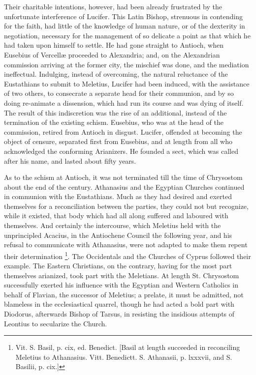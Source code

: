 Their charitable intentions, however, had been already frustrated
by the unfortunate interference of Lucifer. This Latin Bishop,
strenuous in contending for the faith, had little of the knowledge of
human nature, or of the dexterity in negotiation, necessary for the
management of so delicate a point as that which he had taken upon
himself to settle. He had gone straight to Antioch, when Eusebius of
Vercellæ proceeded to Alexandria; and, on the Alexandrian commission
arriving at the former city, the mischief was done, and the mediation
ineffectual. Indulging, instead of overcoming, the natural reluctance
of the Eustathians to submit to Meletius, Lucifer had been induced,
with the assistance of two others, to consecrate a separate head for
their communion, and by so doing re-animate a dissension, which had
run its course and was dying of itself. The result of this
indiscretion was the rise of an additional, instead of the termination
of the existing schism. Eusebius, who was at the head of the
commission, retired from Antioch in disgust. Lucifer, offended at
becoming the object of censure, separated first from Eusebius, and at
length from all who acknowledged the conforming Arianizers. He founded
a sect, which was called after his name, and lasted about fifty years.

As to the schism at Antioch, it was not terminated till the time of
Chrysostom about the end of the century. Athanasius and the Egyptian
Churches continued in communion with the Eustathians. Much as they had
desired and exerted themselves for a reconciliation between the
parties, they could not but recognize, while it existed, that body
which had all along suffered and laboured with themselves. And
certainly the intercourse, which Meletius held with the unprincipled
Acacius, in the Antiochene Council the following year, and his
refusal to communicate with Athanasius, were not adapted to make them
repent their determination \footnote{Vit. S. Basil, p. cix, ed. Benedict. [Basil
at length succeeded in reconciling Meletius to Athanasius. Vitt.
Benedictt. S. Athanasii, p. lxxxvii, and S. Basilii, p. cix.]}.
The Occidentals and the Churches of Cyprus followed their example. The
Eastern Christians, on the contrary, having for the most part
themselves arianized, took part with the Meletians. At length St.
Chrysostom successfully exerted his influence with the Egyptian and
Western Catholics in behalf of Flavian, the successor of Meletius; a
prelate, it must be admitted, not blameless in the ecclesiastical
quarrel, though he had acted a bold part with Diodorus, afterwards
Bishop of Tarsus, in resisting the insidious attempts of Leontius to
secularize the Church.

